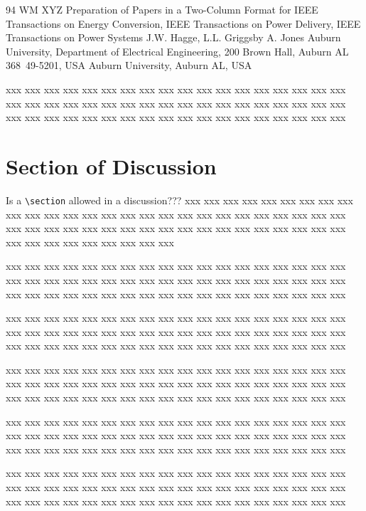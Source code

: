 \documentclass[10pt,twoside%
	]{article}
\begin{document}
\begin{discussion}%
	{94 WM XYZ}%
	{Preparation of Papers in a Two-Column Format for IEEE
	 Transactions on Energy Conversion, IEEE Transactions on Power
	 Delivery, IEEE Transactions on Power Systems}%
	{J.W. Hagge, L.L. Griggsby}%
	{A. Jones}%
	{Auburn University, Department of Electrical Engineering, 200
	 Brown Hall, Auburn AL 368~49-5201, USA}%
	{Auburn University, Auburn AL, USA}

xxx xxx xxx xxx xxx xxx xxx xxx xxx xxx xxx xxx xxx xxx xxx xxx xxx xxx 
xxx xxx xxx xxx xxx xxx xxx xxx xxx xxx xxx xxx xxx xxx xxx xxx xxx xxx 
xxx xxx xxx xxx xxx xxx xxx xxx xxx xxx xxx xxx xxx xxx xxx xxx xxx xxx 

\section{Section of Discussion}

Is a \verb+\section+ allowed in a discussion???
xxx xxx xxx xxx xxx xxx xxx xxx xxx xxx xxx xxx xxx xxx xxx xxx xxx xxx 
xxx xxx xxx xxx xxx xxx xxx xxx xxx xxx xxx xxx xxx xxx xxx xxx xxx xxx 
xxx xxx xxx xxx xxx xxx xxx xxx xxx xxx xxx xxx xxx xxx xxx xxx xxx xxx 

xxx xxx xxx xxx xxx xxx xxx xxx xxx xxx xxx xxx xxx xxx xxx xxx xxx xxx 
xxx xxx xxx xxx xxx xxx xxx xxx xxx xxx xxx xxx xxx xxx xxx xxx xxx xxx 
xxx xxx xxx xxx xxx xxx xxx xxx xxx xxx xxx xxx xxx xxx xxx xxx xxx xxx 

xxx xxx xxx xxx xxx xxx xxx xxx xxx xxx xxx xxx xxx xxx xxx xxx xxx xxx 
xxx xxx xxx xxx xxx xxx xxx xxx xxx xxx xxx xxx xxx xxx xxx xxx xxx xxx 
xxx xxx xxx xxx xxx xxx xxx xxx xxx xxx xxx xxx xxx xxx xxx xxx xxx xxx 

xxx xxx xxx xxx xxx xxx xxx xxx xxx xxx xxx xxx xxx xxx xxx xxx xxx xxx 
xxx xxx xxx xxx xxx xxx xxx xxx xxx xxx xxx xxx xxx xxx xxx xxx xxx xxx 
xxx xxx xxx xxx xxx xxx xxx xxx xxx xxx xxx xxx xxx xxx xxx xxx xxx xxx 

xxx xxx xxx xxx xxx xxx xxx xxx xxx xxx xxx xxx xxx xxx xxx xxx xxx xxx 
xxx xxx xxx xxx xxx xxx xxx xxx xxx xxx xxx xxx xxx xxx xxx xxx xxx xxx 
xxx xxx xxx xxx xxx xxx xxx xxx xxx xxx xxx xxx xxx xxx xxx xxx xxx xxx 

xxx xxx xxx xxx xxx xxx xxx xxx xxx xxx xxx xxx xxx xxx xxx xxx xxx xxx 
xxx xxx xxx xxx xxx xxx xxx xxx xxx xxx xxx xxx xxx xxx xxx xxx xxx xxx 
xxx xxx xxx xxx xxx xxx xxx xxx xxx xxx xxx xxx xxx xxx xxx xxx xxx xxx 


\end{discussion}
\end{document}
